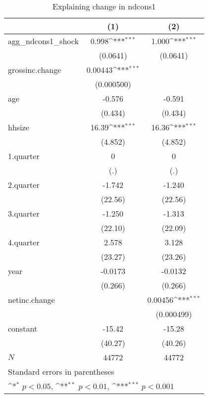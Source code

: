 \begin{table}[htbp]\centering
\def\sym#1{\ifmmode^{#1}\else\(^{#1}\)\fi}
\caption{\label{tab:ndcons1-deltacons} Explaining change in ndcons1}
\begin{tabular}{l*{2}{c}}
\hline\hline
            &\multicolumn{1}{c}{(1)}         &\multicolumn{1}{c}{(2)}         \\
\hline
agg\_ndcons1\_shock&       0.998\sym{***}&       1.000\sym{***}\\
            &    (0.0641)         &    (0.0641)         \\
grossinc.change&     0.00443\sym{***}&                     \\
            &  (0.000500)         &                     \\
age         &      -0.576         &      -0.591         \\
            &     (0.434)         &     (0.434)         \\
hhsize      &       16.39\sym{***}&       16.36\sym{***}\\
            &     (4.852)         &     (4.852)         \\
1.quarter   &           0         &           0         \\
            &         (.)         &         (.)         \\
2.quarter   &      -1.742         &      -1.240         \\
            &     (22.56)         &     (22.56)         \\
3.quarter   &      -1.250         &      -1.313         \\
            &     (22.10)         &     (22.09)         \\
4.quarter   &       2.578         &       3.128         \\
            &     (23.27)         &     (23.26)         \\
year        &     -0.0173         &     -0.0132         \\
            &     (0.266)         &     (0.266)         \\
netinc.change&                     &     0.00456\sym{***}\\
            &                     &  (0.000499)         \\
constant    &      -15.42         &      -15.28         \\
            &     (40.27)         &     (40.26)         \\
\hline
\(N\)       &       44772         &       44772         \\
\hline\hline
\multicolumn{3}{l}{\footnotesize Standard errors in parentheses}\\
\multicolumn{3}{l}{\footnotesize \sym{*} \(p<0.05\), \sym{**} \(p<0.01\), \sym{***} \(p<0.001\)}\\
\end{tabular}
\end{table}
